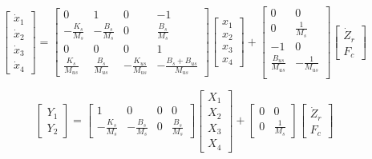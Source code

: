 \begin{equation}
\begin{bmatrix}
	\dot{x}_1 \\
	\dot{x}_2 \\
	\dot{x}_3 \\
	\dot{x}_4
\end{bmatrix} = 
\begin{bmatrix}
	0 & 1 & 0 & -1 \\
	-\frac{K_s}{M_s} & -\frac{B_s}{M_s} & 0 & \frac{B_s}{M_s} \\
	0 & 0 & 0 & 1 \\
	\frac{K_s}{M_{us}} & \frac{B_s}{M_{us}} & -\frac{K_{us}}{M_{us}} & -\frac{B_s + B_{us}}{M_{us}} 
\end{bmatrix}
\begin{bmatrix}
	x_1 \\
	x_2 \\
	x_3 \\
	x_4
\end{bmatrix} + 
\begin{bmatrix}
	0 & 0 \\
	0 & \frac{1}{M_{s}} \\
	-1 & 0 \\
	\frac{B_{us}}{M_{us}} & -\frac{1}{M_{us}} \\
\end{bmatrix}
\begin{bmatrix}
	\dot{Z}_r \\
	F_c
\end{bmatrix}
\end{equation}


\begin{equation}
\begin{bmatrix}
	Y_1 \\
	Y_2
\end{bmatrix} = 
\begin{bmatrix}
	1 & 0 & 0 & 0 \\
	-\frac{K_s}{M_s} & -\frac{B_s}{M_s} & 0 & \frac{B_s}{M_s} 
\end{bmatrix}
\begin{bmatrix}
	X_1 \\
	X_2 \\
	X_3 \\
	X_4
\end{bmatrix} + 
\begin{bmatrix}
	0 & 0 \\
	0 & \frac{1}{M_s}
\end{bmatrix}
\begin{bmatrix}
	\dot{Z}_r \\
	F_c
\end{bmatrix}
\end{equation}

